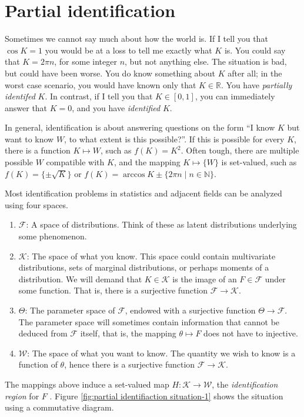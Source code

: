 \section{Partial identification}

Sometimes we cannot say much about how the world is. If I tell you that $\cos K=1$ you would be at a loss to tell me exactly what $K$ is. You could say that $K=2\pi n$, for some integer $n$, but not anything else. The situation is bad, but could have been worse. You do know something about $K$ after all; in the worst case scenario, you would have known only that $K\in\mathbb{R}$. You have \emph{partially identifed} $K$. In contrast, if I tell you that $K\in[0,1]$, you can immediately answer that $K=0$, and you have \emph{identified} $K$.

In general, identification is about answering questions on the form ``I know $K$ but want to know $W$, to what extent is this possible?''. If this is possible for every $K$, there is a function $K\mapsto W$, such as $f(K)=K^{2}$. Often tough, there are multiple possible $W$ compatible with $K$, and the mapping $K\mapsto\{W\}$ is set-valued, such as $f(K)=\{\pm\sqrt{K}\}$ or $f(K) = \arccos{K} \pm \{2\pi n\mid n\in \mathbb{N}\}$.

Most identification problems in statistics and adjacent fields can be analyzed using four spaces.
\begin{enumerate}
\item $\mathcal{F}$: A space of distributions. Think of these as latent distributions underlying some phenomenon. 
\item $\mathcal{K}$: The space of what you know. This space could contain multivariate distributions, sets of marginal distributions, or perhaps moments of a distribution. We will demand that $K\in\mathcal{K}$ is the image of an $F\in\mathcal{F}$ under some function. That is, there is a surjective function $\mathcal{F}\to\mathcal{K}$. 
\item $\Theta$: The parameter space of $\mathcal{F}$, endowed with a surjective function $\Theta\to\mathcal{F}$. The parameter space will sometimes contain information that cannot be deduced from $\mathcal{F}$ itself, that is, the mapping $\theta\mapsto F$ does not have to injective. 
\item $\mathcal{W}$: The space of what you want to know. The quantity we wish to know is a function of $\theta$, hence there is a surjective function $\mathcal{F}\to\mathcal{K}$. 
\end{enumerate}
The mappings above induce a set-valued map $H:\mathcal{K}\to\mathcal{W}$, the \emph{identification region} for $F$ \parencite{Manski2003-aq}.
Figure \ref{fig:partial identifiaction situation-1} shows the situation using a commutative diagram. 

